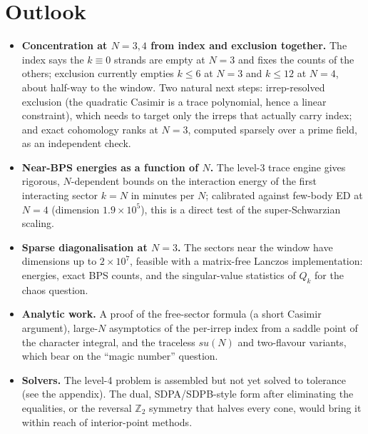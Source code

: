 \documentclass[10pt]{article}
\begin{document}
\section{Outlook}\label{sec:outlook}
\begin{itemize}
\item \textbf{Concentration at $N=3,4$ from index and exclusion together.} The index says the $k\equiv0$ strands are empty at $N=3$ and fixes the counts of the others; exclusion currently empties $k\le6$ at $N=3$ and $k\le12$ at $N=4$, about half-way to the window. Two natural next steps: irrep-resolved exclusion (the quadratic Casimir is a trace polynomial, hence a linear constraint), which needs to target only the irreps that actually carry index; and exact cohomology ranks at $N=3$, computed sparsely over a prime field, as an independent check.
\item \textbf{Near-BPS energies as a function of $N$.} The level-3 trace engine gives rigorous, $N$-dependent bounds on the interaction energy of the first interacting sector $k=N$ in minutes per $N$; calibrated against few-body ED at $N=4$ (dimension $1.9\times10^5$), this is a direct test of the super-Schwarzian scaling.
\item \textbf{Sparse diagonalisation at $N=3$.} The sectors near the window have dimensions up to $2\times10^7$, feasible with a matrix-free Lanczos implementation: energies, exact BPS counts, and the singular-value statistics of $Q_k$ for the chaos question.
\item \textbf{Analytic work.} A proof of the free-sector formula (a short Casimir argument), large-$N$ asymptotics of the per-irrep index from a saddle point of the character integral, and the traceless $su(N)$ and two-flavour variants, which bear on the ``magic number'' question.
\item \textbf{Solvers.} The level-4 problem is assembled but not yet solved to tolerance (see the appendix). The dual, SDPA/SDPB-style form after eliminating the equalities, or the reversal $\mathbb Z_2$ symmetry that halves every cone, would bring it within reach of interior-point methods.
\end{itemize}

\appendix
\end{document}
